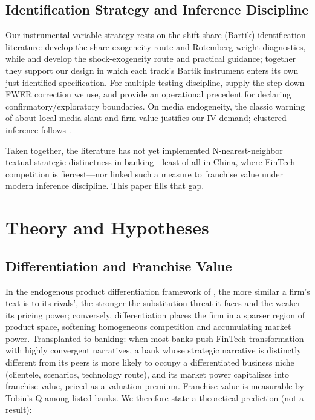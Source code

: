 \subsection{Identification Strategy and Inference Discipline}
Our instrumental-variable strategy rests on the shift-share (Bartik)
identification literature: \textcite{goldsmith2020bartik} develop the
share-exogeneity route and Rotemberg-weight diagnostics, while
\textcite{borusyak2022shiftshare} and
\textcite{borusyak2025shiftshareguide} develop the shock-exogeneity
route and practical guidance; together they support our design in
which each track's Bartik instrument enters its own just-identified
specification. For multiple-testing discipline,
\textcite{romano2005stepwise} supply the step-down FWER correction we
use, and \textcite{list2019multiplehypothesis} provide an operational
precedent for declaring confirmatory/exploratory boundaries. On media
endogeneity, the classic warning of \textcite{gurun2012hype} about
local media slant and firm value justifies our IV demand; clustered
inference follows \textcite{cameron2015practitioner}.

Taken together, the literature has not yet implemented
N-nearest-neighbor textual strategic distinctness in banking---least
of all in China, where FinTech competition is fiercest---nor linked
such a measure to franchise value under modern inference discipline.
This paper fills that gap.

\section{Theory and Hypotheses}\label{sec:theory}

\subsection{Differentiation and Franchise Value}
In the endogenous product differentiation framework of
\textcite{hoberg2016tnic}, the more similar a firm's text is to its
rivals', the stronger the substitution threat it faces and the weaker
its pricing power; conversely, differentiation places the firm in a
sparser region of product space, softening homogeneous competition
and accumulating market power. Transplanted to banking: when most
banks push FinTech transformation with highly convergent narratives,
a bank whose strategic narrative is distinctly different from its
peers is more likely to occupy a differentiated business niche
(clientele, scenarios, technology route), and its market power
capitalizes into franchise value, priced as a valuation premium.
Franchise value is measurable by Tobin's Q among listed banks. We
therefore state a theoretical prediction (not a result):

